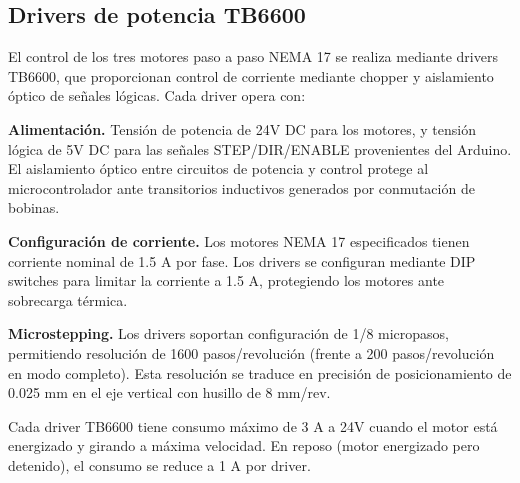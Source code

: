 \subsection{Drivers de potencia TB6600}

El control de los tres motores paso a paso NEMA 17 se realiza mediante drivers TB6600, que proporcionan control de corriente mediante chopper y aislamiento óptico de señales lógicas. Cada driver opera con:

\textbf{Alimentación.} Tensión de potencia de 24V DC para los motores, y tensión lógica de 5V DC para las señales STEP/DIR/ENABLE provenientes del Arduino. El aislamiento óptico entre circuitos de potencia y control protege al microcontrolador ante transitorios inductivos generados por conmutación de bobinas.

\textbf{Configuración de corriente.} Los motores NEMA 17 especificados tienen corriente nominal de 1.5 A por fase. Los drivers se configuran mediante DIP switches para limitar la corriente a 1.5 A, protegiendo los motores ante sobrecarga térmica.

\textbf{Microstepping.} Los drivers soportan configuración de 1/8 micropasos, permitiendo resolución de 1600 pasos/revolución (frente a 200 pasos/revolución en modo completo). Esta resolución se traduce en precisión de posicionamiento de 0.025 mm en el eje vertical con husillo de 8 mm/rev.

Cada driver TB6600 tiene consumo máximo de 3 A a 24V cuando el motor está energizado y girando a máxima velocidad. En reposo (motor energizado pero detenido), el consumo se reduce a 1 A por driver.
